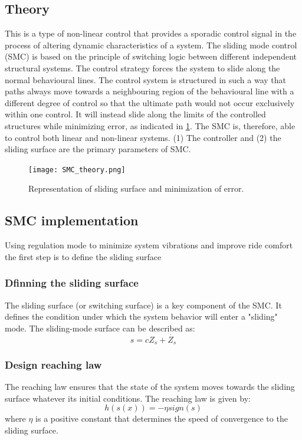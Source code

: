 \subsection{Theory}
This is a type of non-linear control that provides a sporadic control signal in the process of altering dynamic characteristics of a system. The sliding mode control (SMC) is based on the principle of switching logic between different independent structural systems. The control strategy forces the system to slide along the normal behavioural lines. The control system is structured in such a way that paths always move towards a neighbouring region of the behavioural line with a different degree of control so that the ultimate path would not occur exclusively within one control. It will instead slide along the limits of the controlled structures while minimizing error, as indicated in \ref{fig:smc}. The SMC is, therefore, able to control both linear and non-linear systems. (1) The controller and (2) the sliding surface are the primary parameters of SMC.
\begin{figure}[H]
	\centering
	\texttt{[image: SMC\_theory.png]}
	\caption{Representation of sliding surface and minimization of error. \cite{WANI2022103}
	}
	\label{fig:smc}
\end{figure}
\subsection{SMC implementation}
Using regulation mode to minimize system vibrations and improve ride comfort the first step is to define the sliding surface 
\subsubsection{Dfinning the sliding surface}
The sliding surface (or switching surface) is a key component of the SMC. It defines the condition under which the system behavior will enter a "sliding" mode. The sliding-mode surface can be described as:
\begin{equation}
	s = cZ_s+\dot{Z_s}
\end{equation}

\subsubsection{Design reaching law}
The reaching law ensures that the state of the system moves towards the sliding surface whatever its initial conditions. The reaching law is given by:
\begin{equation}
	h\left(s\left(x\right)\right) = -\eta sign\left(s\right)
\end{equation}
where $\eta$ is a positive constant that determines the speed of convergence to the sliding surface.

